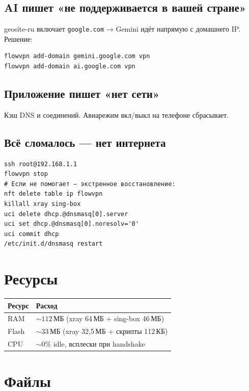 \documentclass[11pt,a4paper]{article}
\begin{document}
\subsection{AI пишет «не поддерживается в вашей стране»}

geosite-ru включает \texttt{google.com} → Gemini идёт напрямую с домашнего IP. Решение:
\begin{lstlisting}
flowvpn add-domain gemini.google.com vpn
flowvpn add-domain ai.google.com vpn
\end{lstlisting}

\subsection{Приложение пишет «нет сети»}

Кэш DNS и соединений. Авиарежим вкл/выкл на телефоне сбрасывает.

\subsection{Всё сломалось — нет интернета}

\begin{lstlisting}
ssh root@192.168.1.1
flowvpn stop
# Если не помогает — экстренное восстановление:
nft delete table ip flowvpn
killall xray sing-box
uci delete dhcp.@dnsmasq[0].server
uci set dhcp.@dnsmasq[0].noresolv='0'
uci commit dhcp
/etc/init.d/dnsmasq restart
\end{lstlisting}

\section{Ресурсы}

\begin{tabularx}{\textwidth}{l X}
\toprule
\textbf{Ресурс} & \textbf{Расход} \\
\midrule
RAM & ${\sim}112$\,МБ (xray 64\,МБ + sing-box 46\,МБ) \\
Flash & ${\sim}33$\,МБ (xray 32{,}5\,МБ + скрипты 112\,КБ) \\
CPU & ${\sim}0\%$ idle, всплески при handshake \\
\bottomrule
\end{tabularx}

\section{Файлы}
\end{document}
